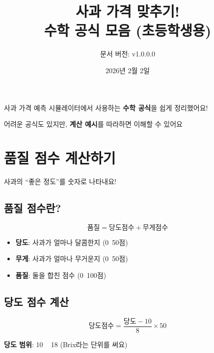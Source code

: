 \documentclass[12pt,a4paper]{article}
\title{\Huge\textbf{\texttwemoji{red apple} 사과 가격 맞추기!}\\[0.5em]
\Large 수학 공식 모음 \textbf{(초등학생용)}}
\author{문서 버전: v1.0.0.0}
\date{2026년 2월 2일}
\begin{document}
\maketitle

\begin{tcolorbox}[colback=lightpink,colframe=magenta!50!black,title=\textbf{\texttwemoji{waving hand} 이 문서는요...}]
\large
사과 가격 예측 시뮬레이터에서 사용하는 \textbf{수학 공식}을 쉽게 정리했어요!

어려운 공식도 있지만, \textbf{계산 예시}를 따라하면 이해할 수 있어요 
\end{tcolorbox}

\tableofcontents
\newpage

\section{ 품질 점수 계산하기}

사과의 ``좋은 정도''를 숫자로 나타내요!

\subsection{ 품질 점수란?}

\begin{tcolorbox}[colback=lightcyan,colframe=teal,title=\textbf{\texttwemoji{sparkles} 품질 점수 = 당도 점수 + 무게 점수}]
\Large
\begin{equation}
\boxed{\text{품질} = \text{당도점수} + \text{무게점수}}
\end{equation}
\normalsize

\begin{itemize}
    \item \textbf{당도}: 사과가 얼마나 달콤한지 (0~50점)
    \item \textbf{무게}: 사과가 얼마나 무거운지 (0~50점)
    \item \textbf{품질}: 둘을 합친 점수 (0~100점)
\end{itemize}
\end{tcolorbox}

\subsection{ 당도 점수 계산}

\begin{tcolorbox}[colback=lightblue,colframe=darkblue,title=\textbf{당도 점수 공식}]
\Large
\begin{equation}
\text{당도점수} = \frac{\text{당도} - 10}{8} \times 50
\end{equation}
\normalsize

\textbf{당도 범위}: 10 ~ 18 (Brix라는 단위를 써요)
\end{tcolorbox}
\end{document}
